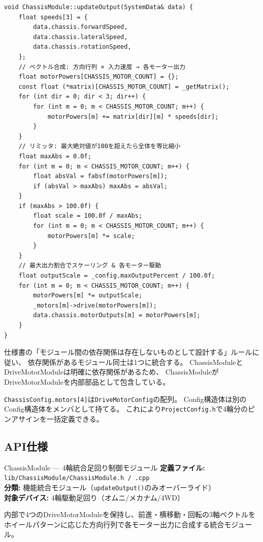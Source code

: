 \begin{lstlisting}[style=cppstyle, caption={ChassisModule.cpp — updateOutput()でベクトル合成→各モーターをdrive()}]
void ChassisModule::updateOutput(SystemData& data) {
    float speeds[3] = {
        data.chassis.forwardSpeed,
        data.chassis.lateralSpeed,
        data.chassis.rotationSpeed,
    };
    // ベクトル合成: 方向行列 × 入力速度 → 各モーター出力
    float motorPowers[CHASSIS_MOTOR_COUNT] = {};
    const float (*matrix)[CHASSIS_MOTOR_COUNT] = _getMatrix();
    for (int dir = 0; dir < 3; dir++) {
        for (int m = 0; m < CHASSIS_MOTOR_COUNT; m++) {
            motorPowers[m] += matrix[dir][m] * speeds[dir];
        }
    }
    // リミッタ: 最大絶対値が100を超えたら全体を等比縮小
    float maxAbs = 0.0f;
    for (int m = 0; m < CHASSIS_MOTOR_COUNT; m++) {
        float absVal = fabsf(motorPowers[m]);
        if (absVal > maxAbs) maxAbs = absVal;
    }
    if (maxAbs > 100.0f) {
        float scale = 100.0f / maxAbs;
        for (int m = 0; m < CHASSIS_MOTOR_COUNT; m++) {
            motorPowers[m] *= scale;
        }
    }
    // 最大出力割合でスケーリング & 各モーター駆動
    float outputScale = _config.maxOutputPercent / 100.0f;
    for (int m = 0; m < CHASSIS_MOTOR_COUNT; m++) {
        motorPowers[m] *= outputScale;
        _motors[m]->drive(motorPowers[m]);
        data.chassis.motorOutputs[m] = motorPowers[m];
    }
}
\end{lstlisting}

\begin{pointbox}[機能統合の原則]
仕様書の「モジュール間の依存関係は存在しないものとして設計する」ルールに従い、
依存関係があるモジュール同士は1つに統合する。
ChassisModuleとDriveMotorModuleは明確に依存関係があるため、
ChassisModuleがDriveMotorModuleを内部部品として包含している。
\end{pointbox}

\begin{notebox}[Config構造体のネスト]
\texttt{ChassisConfig.motors[4]}は\texttt{DriveMotorConfig}の配列。
Config構造体は別のConfig構造体をメンバとして持てる。
これにより\texttt{ProjectConfig.h}で4輪分のピンアサインを一括定義できる。
\end{notebox}

\subsection{API仕様}


\begin{apibox}{ChassisModule --- 4輪統合足回り制御モジュール}
\textbf{定義ファイル:} \texttt{lib/ChassisModule/ChassisModule.h / .cpp}\\
\textbf{分類:} 機能統合モジュール（\texttt{updateOutput()}のみオーバーライド）\\
\textbf{対象デバイス:} 4輪駆動足回り（オムニ/メカナム/4WD）

内部で4つのDriveMotorModuleを保持し、前進・横移動・回転の3軸ベクトルを
ホイールパターンに応じた方向行列で各モーター出力に合成する統合モジュール。
\end{apibox}

